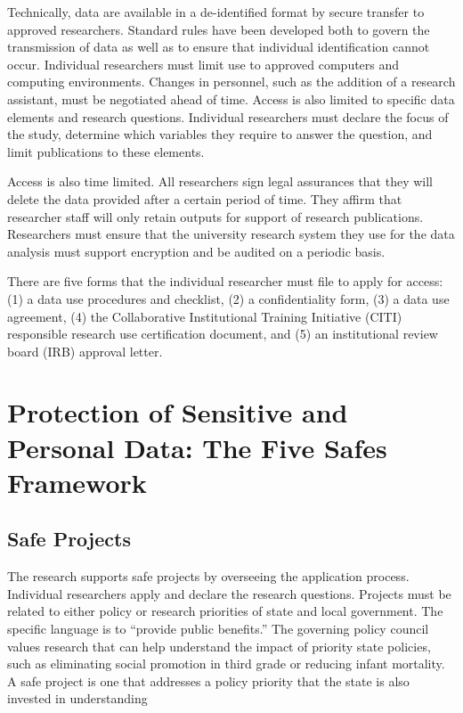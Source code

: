 \documentclass[
]{book}
\begin{document}
Technically, data are available in a de-identified format by secure transfer to approved researchers. Standard rules have been developed both to govern the transmission of data as well as to ensure that individual identification cannot occur. Individual researchers must limit use to approved computers and computing environments. Changes in personnel, such as the addition of a research assistant, must be negotiated ahead of time. Access is also limited to specific data elements and research questions. Individual researchers must declare the focus of the study, determine which variables they require to answer the question, and limit publications to these elements.

Access is also time limited. All researchers sign legal assurances that they will delete the data provided after a certain period of time. They affirm that researcher staff will only retain outputs for support of research publications. Researchers must ensure that the university research system they use for the data analysis must support encryption and be audited on a periodic basis.

There are five forms that the individual researcher must file to apply for access: (1) a data use procedures and checklist, (2) a confidentiality form, (3) a data use agreement, (4) the Collaborative Institutional Training Initiative (CITI) responsible research use certification document, and (5) an institutional review board (IRB) approval letter.

\hypertarget{protection-of-sensitive-and-personal-data-the-five-safes-framework-1}{%
\section{Protection of Sensitive and Personal Data: The Five Safes Framework}\label{protection-of-sensitive-and-personal-data-the-five-safes-framework-1}}

\hypertarget{safe-projects-1}{%
\subsection{Safe Projects}\label{safe-projects-1}}

The research supports safe projects by overseeing the application process. Individual researchers apply and declare the research questions. Projects must be related to either policy or research priorities of state and local government. The specific language is to ``provide public benefits.'' The governing policy council values research that can help understand the impact of priority state policies, such as eliminating social promotion in third grade or reducing infant mortality. A safe project is one that addresses a policy priority that the state is also invested in understanding
\end{document}
